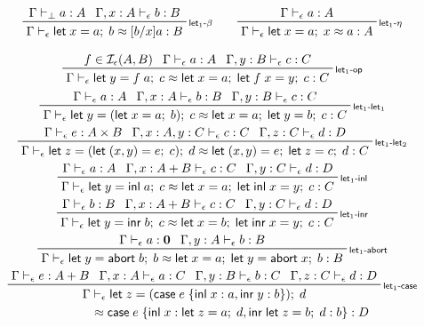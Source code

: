 \documentclass[acmsmall,screen,review]{acmart}
\newcommand{\mc}[1]{\ensuremath{\mathcal{#1}}}
\newcommand{\mb}[1]{\ensuremath{\mathbf{#1}}}
\newcommand{\ms}[1]{\ensuremath{\mathsf{#1}}}
\newcommand{\lto}{:}
\newcommand{\linl}[1]{\ms{inl}\;{#1}}
\newcommand{\linr}[1]{\ms{inr}\;{#1}}
\newcommand{\labort}[1]{\ms{abort}\;{#1}}
\newcommand{\letexpr}[3]{\ensuremath{\ms{let}\;#1 = #2;\;#3}}
\newcommand{\caseexpr}[5]{\ms{case}\;#1\;\{\linl{#2} \lto #3, \linr{#4} \lto #5\}}
\newcommand{\bhyp}[2]{#1 : #2}
\newcommand{\rle}[1]{{\scriptsize\textsf{#1}}}
\newcommand{\hasty}[4]{#1 \vdash_{#2} #3: {#4}}
\newcommand{\isop}[4]{#1 \in \mc{I}_{#4}(#2, #3)}
\newcommand{\teqv}{\approx}
\newcommand{\tmeq}[5]{#1 \vdash_{#2} #3 \teqv #4 : {#5}}
\begin{document}
\begin{gather*}
  \prftree[r]{\rle{let$_1$-$\beta$}}
    {\hasty{\Gamma}{\bot}{a}{A}}
    {\hasty{\Gamma, \bhyp{x}{A}}{\epsilon}{b}{B}}
    {\tmeq{\Gamma}{\epsilon}{\letexpr{x}{a}{b}}{[b/x]a}{B}}
  \qquad
  \prftree[r]{\rle{let$_1$-$\eta$}}
    {\hasty{\Gamma}{\epsilon}{a}{A}}
    {\tmeq{\Gamma}{\epsilon}{\letexpr{x}{a}{x}}{a}{A}}
\end{gather*}

\begin{gather*}
  \prftree[r]{\rle{let$_1$-op}}
    {\isop{f}{A}{B}{\epsilon}}
    {\hasty{\Gamma}{\epsilon}{a}{A}}
    {\hasty{\Gamma, \bhyp{y}{B}}{\epsilon}{c}{C}}
    {\tmeq{\Gamma}{\epsilon}{\letexpr{y}{f\;a}{c}}{\letexpr{x}{a}{\letexpr{f\;x}{y}{c}}}{C}}
  \\
  \prftree[r]{\rle{let$_1$-let$_1$}}
    {\hasty{\Gamma}{\epsilon}{a}{A}}
    {\hasty{\Gamma, \bhyp{x}{A}}{\epsilon}{b}{B}}
    {\hasty{\Gamma, \bhyp{y}{B}}{\epsilon}{c}{C}}
    {\tmeq{\Gamma}{\epsilon}
      {\letexpr{y}{(\letexpr{x}{a}{b})}{c}}
      {\letexpr{x}{a}{\letexpr{y}{b}{c}}}{C}}
  \\
  \prftree[r]{\rle{let$_1$-let$_2$}}
    {\hasty{\Gamma}{\epsilon}{e}{A \times B}}
    {\hasty{\Gamma, \bhyp{x}{A}, \bhyp{y}{C}}{\epsilon}{c}{C}}
    {\hasty{\Gamma, \bhyp{z}{C}}{\epsilon}{d}{D}}
    {\tmeq{\Gamma}{\epsilon}
      {\letexpr{z}{(\letexpr{(x, y)}{e}{c})}{d}}
      {\letexpr{(x, y)}{e}{\letexpr{z}{c}{d}}}{C}}
  \\
  \prftree[r]{\rle{let$_1$-inl}}
    {\hasty{\Gamma}{\epsilon}{a}{A}}
    {\hasty{\Gamma, \bhyp{x}{A + B}}{\epsilon}{c}{C}}
    {\hasty{\Gamma, \bhyp{y}{C}}{\epsilon}{d}{D}}
    {\tmeq{\Gamma}{\epsilon}{\letexpr{y}{\linl{a}}{c}}{\letexpr{x}{a}{\letexpr{\linl{x}}{y}{c}}}{C}}
  \\
  \prftree[r]{\rle{let$_1$-inr}}
    {\hasty{\Gamma}{\epsilon}{b}{B}}
    {\hasty{\Gamma, \bhyp{x}{A + B}}{\epsilon}{c}{C}}
    {\hasty{\Gamma, \bhyp{y}{C}}{\epsilon}{d}{D}}
    {\tmeq{\Gamma}{\epsilon}{\letexpr{y}{\linr{b}}{c}}{\letexpr{x}{b}{\letexpr{\linr{x}}{y}{c}}}{C}}
  \\
  \prftree[r]{\rle{let$_1$-abort}}
    {\hasty{\Gamma}{\epsilon}{a}{\mb{0}}}
    {\hasty{\Gamma, \bhyp{y}{A}}{\epsilon}{b}{B}}
    {\tmeq{\Gamma}{\epsilon}
      {\letexpr{y}{\labort{b}}{b}}
      {\letexpr{x}{a}{\letexpr{y}{\labort{x}}{b}}}{B}}
  \\
  \prftree[r]{\rle{let$_1$-case}}
    {\hasty{\Gamma}{\epsilon}{e}{A + B}}
    {\hasty{\Gamma, \bhyp{x}{A}}{\epsilon}{a}{C}}
    {\hasty{\Gamma, \bhyp{y}{B}}{\epsilon}{b}{C}}
    {\hasty{\Gamma, \bhyp{z}{C}}{\epsilon}{d}{D}}
    { 
      \prfStackPremises
      {\Gamma \vdash_\epsilon \letexpr{z}{(\caseexpr{e}{x}{a}{y}{b})}{d}}
      {\hspace{6em} \teqv \caseexpr{e}{x}{\letexpr{z}{a}{d}}{\letexpr{z}{b}{d}}{b} : D}
    }
\end{gather*}
\end{document}
